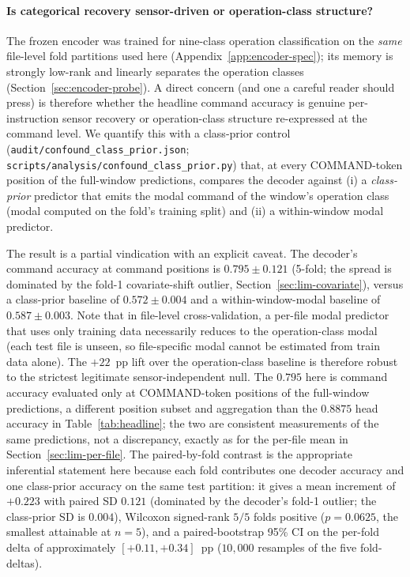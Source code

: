 \documentclass[sensors,article,submit,moreauthors,pdftex]{Definitions/mdpi}
\begin{document}
\paragraph{Is categorical recovery sensor-driven or operation-class structure?}\label{sec:disc-confound}\hspace*{0pt plus 1fill}

The frozen encoder was trained for nine-class operation classification on the \emph{same} file-level fold partitions used here (Appendix~\ref{app:encoder-spec}); its memory is strongly low-rank and linearly separates the operation classes (Section~\ref{sec:encoder-probe}). A direct concern (and one a careful reader should press) is therefore whether the headline command accuracy is genuine per-instruction sensor recovery or operation-class structure re-expressed at the command level. We quantify this with a class-prior control (\texttt{audit/confound\_class\_prior.json}; \texttt{scripts/analysis/confound\_class\_prior.py}) that, at every COMMAND-token position of the full-window predictions, compares the decoder against (i) a \emph{class-prior} predictor that emits the modal command of the window's operation class (modal computed on the fold's training split) and (ii) a within-window modal predictor.

The result is a partial vindication with an explicit caveat. The decoder's command accuracy at command positions is $0.795 \pm 0.121$ (5-fold; the spread is dominated by the fold-1 covariate-shift outlier, Section~\ref{sec:lim-covariate}), versus a class-prior baseline of $0.572 \pm 0.004$ and a within-window-modal baseline of $0.587 \pm 0.003$. Note that in file-level cross-validation, a per-file modal predictor that uses only training data necessarily reduces to the operation-class modal (each test file is unseen, so file-specific modal cannot be estimated from train data alone). The $+22$~pp lift over the operation-class baseline is therefore robust to the strictest legitimate sensor-independent null. The $0.795$ here is command accuracy evaluated only at COMMAND-token positions of the full-window predictions, a different position subset and aggregation than the $0.8875$ head accuracy in Table~\ref{tab:headline}; the two are consistent measurements of the same predictions, not a discrepancy, exactly as for the per-file mean in Section~\ref{sec:lim-per-file}. The paired-by-fold contrast is the appropriate inferential statement here because each fold contributes one decoder accuracy and one class-prior accuracy on the same test partition: it gives a mean increment of $+0.223$ with paired SD $0.121$ (dominated by the decoder's fold-1 outlier; the class-prior SD is $0.004$), Wilcoxon signed-rank $5/5$ folds positive ($p\!=\!0.0625$, the smallest attainable at $n\!=\!5$), and a paired-bootstrap 95\% CI on the per-fold delta of approximately $[+0.11, +0.34]$~pp ($10{,}000$ resamples of the five fold-deltas).
\end{document}

